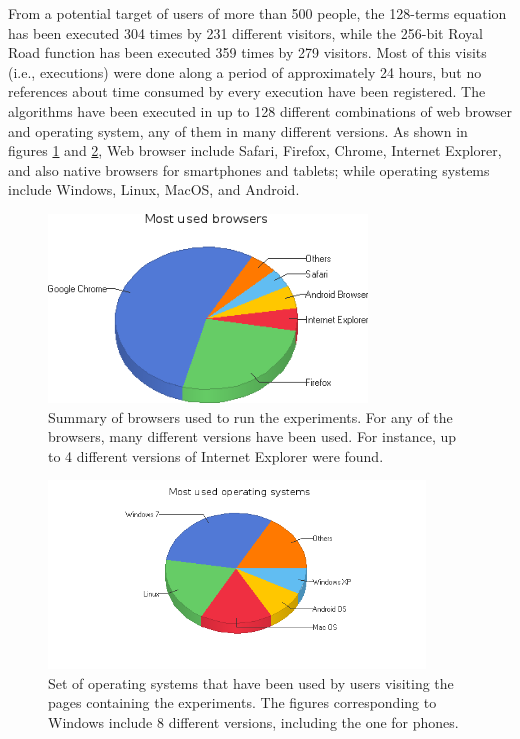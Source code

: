\documentclass[runningheads,a4paper]{llncs}
\begin{document}
From a potential target of users of more than 500 people, the 128-terms equation has been executed 304 times by 231 different visitors, while the 256-bit Royal Road function has been executed 359 times by 279 visitors. Most of this visits (i.e., executions) were done along a period of approximately 24 hours, but no references about time consumed by every execution have been registered. The algorithms have been executed in up to 128 different combinations of web browser and operating system, any of them in many different versions. As shown in figures \ref{fig:browsers} and \ref{fig:operating-systems}, Web browser include Safari, Firefox, Chrome, Internet Explorer, and also native browsers for smartphones and tablets; while operating systems include Windows, Linux, MacOS, and Android.

\begin{figure}
\centering
\includegraphics[height=5cm]{Most_Used_Browsers}
\caption{Summary of browsers used to run the experiments. For any of the browsers, many different versions have been used. For instance, up to 4 different versions of Internet Explorer were found.}
\label{fig:browsers}
\end{figure}


\begin{figure}
\centering
\includegraphics[height=5cm]{Most_Used_Operating_Systems}
\caption{Set of operating systems that have been used by users visiting the pages containing the experiments. The figures corresponding to Windows include 8 different versions, including the one for phones.
}
\label{fig:operating-systems}
\end{figure}
\end{document}
